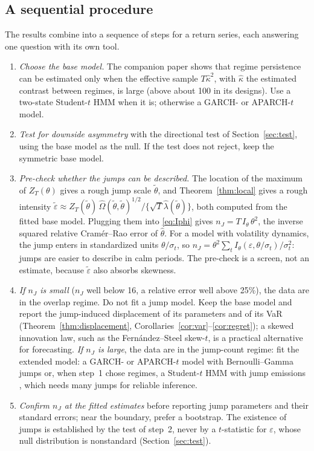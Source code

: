 \documentclass[11pt,a4paper]{article}
\theoremstyle{definition}
\theoremstyle{remark}
\begin{document}
\subsection{A sequential procedure}\label{sec:procedure}
The results combine into a sequence of steps for a return series, each answering one question with its own tool.
\begin{enumerate}[itemsep=2pt]
\item \emph{Choose the base model.} The companion paper \citet{giornoA} shows that regime persistence can be estimated only when the effective sample $T\hat\kappa^2$, with $\hat\kappa$ the estimated contrast between regimes, is large (above about 100 in its designs). Use a two-state Student-$t$ HMM when it is; otherwise a GARCH- or APARCH-$t$ model.
\item \emph{Test for downside asymmetry} with the directional test of Section~\ref{sec:test}, using the base model as the null. If the test does not reject, keep the symmetric base model.
\item \emph{Pre-check whether the jumps can be described.} The location of the maximum of $Z_T(\theta)$ gives a rough jump scale $\tilde\theta$, and Theorem~\ref{thm:local} gives a rough intensity $\tilde\varepsilon\approx Z_T(\tilde\theta)\,\hat\Omega(\tilde\theta,\tilde\theta)^{1/2}/\{\sqrt T\hat\lambda(\tilde\theta)\}$, both computed from the fitted base model. Plugging them into \eqref{eq:Iphi} gives $n_J=T\,I_\theta\,\theta^2$, the inverse squared relative Cram\'er--Rao error of $\hat\theta$. For a model with volatility dynamics, the jump enters in standardized units $\theta/\sigma_t$, so $n_J=\theta^2\sum_tI_\theta(\varepsilon,\theta/\sigma_t)/\sigma_t^2$: jumps are easier to describe in calm periods. The pre-check is a screen, not an estimate, because $\tilde\varepsilon$ also absorbs skewness.
\item \emph{If $n_J$ is small} ($n_J$ well below 16, a relative error well above 25\%), the data are in the overlap regime. Do not fit a jump model. Keep the base model and report the jump-induced displacement of its parameters and of its VaR (Theorem~\ref{thm:displacement}, Corollaries~\ref{cor:var}--\ref{cor:regret}); a skewed innovation law, such as the Fern\'andez--Steel skew-$t$, is a practical alternative for forecasting. \emph{If $n_J$ is large}, the data are in the jump-count regime: fit the extended model: a GARCH- or APARCH-$t$ model with Bernoulli--Gamma jumps or, when step~1 chose regimes, a Student-$t$ HMM with jump emissions \citep{giornoB}, which needs many jumps for reliable inference.
\item \emph{Confirm $n_J$ at the fitted estimates} before reporting jump parameters and their standard errors; near the boundary, prefer a bootstrap. The existence of jumps is established by the test of step~2, never by a $t$-statistic for $\varepsilon$, whose null distribution is nonstandard (Section~\ref{sec:test}).
\end{enumerate}
\end{document}
